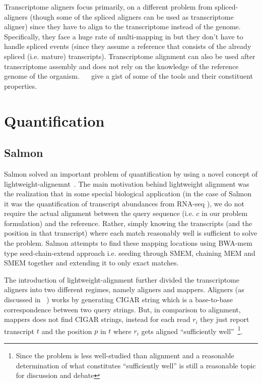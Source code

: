 Transcriptome aligners focus primarily, on a different problem from spliced-aligners (though some of the spliced aligners can be used as transcriptome aligner) since they have to align \reads to the transcriptome instead of the genome. Specifically, they face a huge rate of multi-mapping in \reads but they don't have to handle spliced events (since they assume a reference that consists of the already spliced (i.e. mature) transcripts). Transcriptome alignment can also be used after \denovo transcriptome assembly and does not rely on the knowledge of the reference genome of the organism. ~~\citep{li2010survey} give a gist of some of the tools and their constituent properties.

\section{Quantification}

\subsection{Salmon~\citep{patro2015salmon}} \label{salmon}

Salmon solved an important problem of quantification by using a novel concept of lightweight-alignemnt~\citep{patro2015salmon}. The main motivation behind lightweight alignment was the realization that in some special biological application (in the case of Salmon it was the quantification of transcript abundances from RNA-seq \reads), we do not require the actual alignment between the query sequence (i.e. $c$ in our problem formulation) and the reference. Rather, simply knowing the transcripts (and the position in that transcript) where each match reasonably well is sufficient to solve the problem. Salmon attempts to find these mapping locations using BWA-mem type seed-chain-extend approach i.e. seeding through SMEM, chaining MEM and SMEM together and extending it to only exact matches.

The introduction of lightweight-alignment further divided the transcriptome aligners into two different regimes, namely aligners and mappers. Aligners (as discussed in ~) works by generating CIGAR string which is a base-to-base correspondence between two query strings. But, in comparison to alignment, mappers does not find CIGAR strings, instead for each read $r_i$ they just report transcript $t$ and the position $p$ in $t$ where $r_i$ gets aligned “sufficiently well”~\citep{blog}\footnote{Since the problem is less well-studied than alignment and a reasonable determination of what constitutes “sufficiently well” is still a reasonable topic for discussion and debate}.

